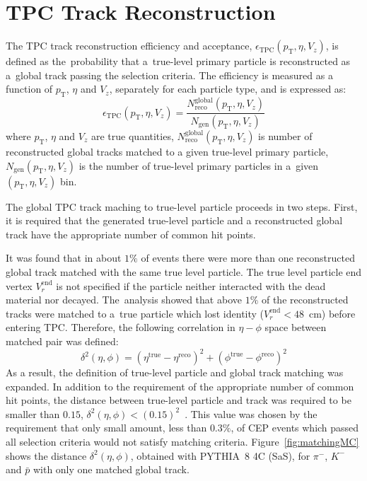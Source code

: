 \section{TPC Track Reconstruction}\label{section:star_TPCeffi}
The TPC track reconstruction efficiency and acceptance,
$\epsilon_\textrm{TPC}\left(p_\textrm{T},\eta,V_{z}\right)$, is defined as the~probability that a~true-level primary particle is reconstructed as a~global track passing the selection criteria. The efficiency is measured as a function of $p_\textrm{T}$, $\eta$ and $V_z$, separately for each particle type, and is expressed as:
\begin{equation}
\epsilon_\textrm{TPC}\left(p_\textrm{T},\eta,V_{z}\right) =
\frac{N_\textrm{reco}^\textrm{global}\left(p_\textrm{T},\eta,V_{z}\right)}{N_\textrm{gen}\left(p_\textrm{T},\eta,V_{z}\right)}
\end{equation}
where $p_\textrm{T}$, $\eta$ and $V_z$ are true quantities, $N_\textrm{reco}^\textrm{global}\left(p_\textrm{T},\eta,V_{z}\right)$ is number of reconstructed global tracks matched to a given true-level primary particle, $N_\textrm{gen}\left(p_\textrm{T},\eta,V_{z}\right)$ is the number of true-level primary particles in a~given $\left(p_\textrm{T},\eta,V_{z}\right)$ bin. 

The global TPC track maching to true-level particle proceeds in two steps. First, it is required that the generated true-level particle and a reconstructed global track have the appropriate number of common hit points. 

It was found that in about $1\%$ of events there were more than one reconstructed global track matched with the same true level particle.
The true level particle end vertex $V_r^{\textrm{end}}$ is not specified if the particle neither interacted with the dead material 
nor decayed. The~analysis showed that above $1\%$ of the reconstructed tracks were matched to a~true particle which lost identity ($V_r^{\textrm{end}}<48$~cm) before entering TPC. Therefore, the following correlation in $\eta-\phi$ space between matched pair was defined:
\begin{equation}
\delta^2\left(\eta,\phi\right)=\left(\eta^\textrm{{true}}-\eta^\textrm{{reco}}\right)^2+\left(\phi^\textrm{{true}}-\phi^\textrm{{reco}}\right)^2
\end{equation}
As a result, the definition of true-level particle and global track matching was expanded. In addition to the requirement of the appropriate number of common hit points, the distance between true-level particle and track was required to be smaller than $0.15$, $\delta^2\left(\eta,\phi\right) < (0.15)^2$~\cite{RafalThesis}. This value was chosen by the requirement that only  small amount, less than $0.3\%$, of \ac{CEP} events which passed all selection criteria would not satisfy matching criteria. Figure~\ref{fig:matchingMC} shows the distance $\delta^2\left(\eta,\phi\right)$, obtained with PYTHIA~8 4C (SaS),  for $\pi^-$, $K^-$ and $\bar{p}$ with only one matched global track. 


